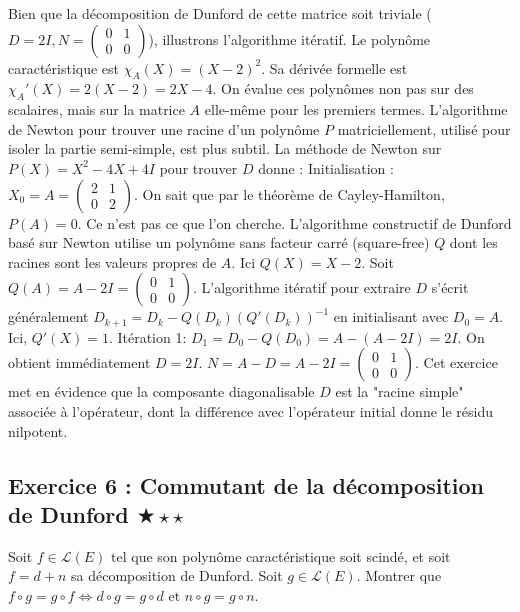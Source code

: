 \documentclass[11pt,a4paper]{article}
\begin{document}
Bien que la décomposition de Dunford de cette matrice soit triviale ($D=2I, N=\begin{pmatrix}0&1\\0&0\end{pmatrix}$), illustrons l'algorithme itératif.
Le polynôme caractéristique est $\chi_A(X) = (X-2)^2$. Sa dérivée formelle est $\chi_A'(X) = 2(X-2) = 2X - 4$.
On évalue ces polynômes non pas sur des scalaires, mais sur la matrice $A$ elle-même pour les premiers termes.
L'algorithme de Newton pour trouver une racine d'un polynôme $P$ matriciellement, utilisé pour isoler la partie semi-simple, est plus subtil. La méthode de Newton sur $P(X) = X^2 - 4X + 4I$ pour trouver $D$ donne :
Initialisation : $X_0 = A = \begin{pmatrix} 2 & 1 \\ 0 & 2 \end{pmatrix}$.
On sait que par le théorème de Cayley-Hamilton, $P(A) = 0$. Ce n'est pas ce que l'on cherche.
L'algorithme constructif de Dunford basé sur Newton utilise un polynôme sans facteur carré (square-free) $Q$ dont les racines sont les valeurs propres de $A$.
Ici $Q(X) = X - 2$.
Soit $Q(A) = A - 2I = \begin{pmatrix} 0 & 1 \\ 0 & 0 \end{pmatrix}$.
L'algorithme itératif pour extraire $D$ s'écrit généralement $D_{k+1} = D_k - Q(D_k)(Q'(D_k))^{-1}$ en initialisant avec $D_0 = A$.
Ici, $Q'(X) = 1$.
Itération 1: $D_1 = D_0 - Q(D_0) = A - (A-2I) = 2I$.
On obtient immédiatement $D = 2I$.
$N = A - D = A - 2I = \begin{pmatrix} 0 & 1 \\ 0 & 0 \end{pmatrix}$.
Cet exercice met en évidence que la composante diagonalisable $D$ est la "racine simple" associée à l'opérateur, dont la différence avec l'opérateur initial donne le résidu nilpotent.

\vspace{1cm}
\subsection*{Exercice 6 : Commutant de la décomposition de Dunford $\bigstar\star\star$}

Soit $f \in \mathcal{L}(E)$ tel que son polynôme caractéristique soit scindé, et soit $f = d + n$ sa décomposition de Dunford.
Soit $g \in \mathcal{L}(E)$. Montrer que $f \circ g = g \circ f \iff d \circ g = g \circ d \text{ et } n \circ g = g \circ n$.
\end{document}
